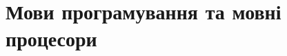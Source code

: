 \documentclass[a4paper, 12pt]{article}
\begin{document}
\tableofcontents

\section{Мови програмування та мовні процесори} 
\end{document}
